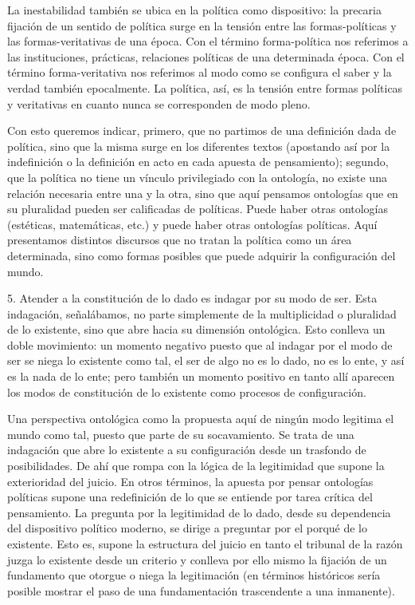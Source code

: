 La inestabilidad también se ubica en la política como dispositivo: la
precaria fijación de un sentido de política surge en la tensión entre
las formas-políticas y las formas-veritativas de una época. Con el
término forma-política nos referimos a las instituciones, prácticas,
relaciones políticas de una determinada época. Con el término
forma-veritativa nos referimos al modo como se configura el saber y la
verdad también epocalmente. La política, así, es la tensión entre formas
políticas y veritativas en cuanto nunca se corresponden de modo pleno.

Con esto queremos indicar, primero, que no partimos de una definición
dada de política, sino que la misma surge en los diferentes textos
(apostando así por la indefinición o la definición en acto en cada
apuesta de pensamiento); segundo, que la política no tiene un vínculo
privilegiado con la ontología, no existe una relación necesaria entre
una y la otra, sino que aquí pensamos ontologías que en su pluralidad
pueden ser calificadas de políticas. Puede haber otras ontologías
(estéticas, matemáticas, etc.) y puede haber otras ontologías políticas.
Aquí presentamos distintos discursos que no tratan la política como un
área determinada, sino como formas posibles que puede adquirir la
configuración del mundo.

5. Atender a la constitución de lo dado es indagar por su modo de ser. Esta
indagación, señalábamos, no parte simplemente de la multiplicidad o
pluralidad de lo existente, sino que abre hacia su dimensión ontológica.
Esto conlleva un doble movimiento: un momento negativo puesto que al
indagar por el modo de ser se niega lo existente como tal, el ser de
algo no es lo dado, no es lo ente, y así es la nada de lo ente; pero
también un momento positivo en tanto allí aparecen los modos de
constitución de lo existente como procesos de configuración.

Una perspectiva ontológica como la propuesta aquí de ningún modo
legitima el mundo como tal, puesto que parte de su socavamiento. Se
trata de una indagación que abre lo existente a su configuración desde
un trasfondo de posibilidades. De ahí que rompa con la lógica de la
legitimidad que supone la exterioridad del juicio. En otros términos, la
apuesta por pensar ontologías políticas supone una redefinición de lo
que se entiende por tarea crítica del pensamiento. La pregunta por la
legitimidad de lo dado, desde su dependencia del dispositivo político
moderno, se dirige a preguntar por el porqué de lo existente. Esto es,
supone la estructura del juicio en tanto el tribunal de la razón juzga
lo existente desde un criterio y conlleva por ello mismo la fijación de
un fundamento que otorgue o niega la legitimación (en términos
históricos sería posible mostrar el paso de una fundamentación
trascendente a una inmanente).

